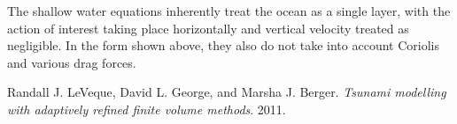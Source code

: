 \documentclass[11pt]{article}
\begin{document}
The shallow water equations inherently treat the ocean as a single layer, with the action of interest taking place horizontally and vertical velocity treated as negligible. In the form shown above, they also do not take into account Coriolis and various drag forces.


\begin{thebibliography}{9}
	Randall J. LeVeque, David L. George, and Marsha J. Berger.
	\emph{Tsunami modelling with adaptively refined finite volume methods}.
	2011.
\end{thebibliography}
\end{document}
